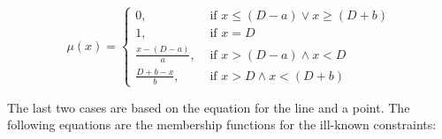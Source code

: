\documentclass{llncs}
\begin{document}
\begin{equation}
 \label{eq:triangular-membership}
\mu\left(x \right) =
\begin{cases}
 0, & \mbox{ if } x \leq \left(D-a \right) \vee x \geq \left( D+b\right)\\
1, & \mbox{ if } x = D\\
\frac{x-(D-a)}{a} , & \mbox{ if } x > \left(D-a \right) \wedge x< D\\
\frac{D+b-x}{b} , & \mbox{ if } x > D \wedge x< \left(D +b\right)
\end{cases}
\end{equation}

The last two cases are based on the equation for the line and a point. The following equations are the membership functions for the ill-known constraints:
\end{document}
